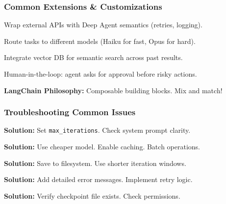 \documentclass[aspectratio=169,11pt]{beamer}
\begin{document}
\begin{frame}[fragile]
\frametitle{Common Extensions \& Customizations}

\begin{conceptbox}
Wrap external APIs with Deep Agent semantics (retries, logging).
\end{conceptbox}

\begin{conceptbox}
Route tasks to different models (Haiku for fast, Opus for hard).
\end{conceptbox}

\begin{conceptbox}
Integrate vector DB for semantic search across past results.
\end{conceptbox}

\begin{conceptbox}
Human-in-the-loop: agent asks for approval before risky actions.
\end{conceptbox}

\vspace{0.5em}
\textcolor{lcblue}{\textbf{LangChain Philosophy:}} Composable building blocks. Mix and match!

\end{frame}

\begin{frame}[fragile]
\frametitle{Troubleshooting Common Issues}

\begin{warningbox}
\textbf{Solution:} Set \texttt{max\_iterations}. Check system prompt clarity.
\end{warningbox}

\begin{warningbox}
\textbf{Solution:} Use cheaper model. Enable caching. Batch operations.
\end{warningbox}

\begin{warningbox}
\textbf{Solution:} Save to filesystem. Use shorter iteration windows.
\end{warningbox}

\begin{warningbox}
\textbf{Solution:} Add detailed error messages. Implement retry logic.
\end{warningbox}

\begin{warningbox}
\textbf{Solution:} Verify checkpoint file exists. Check permissions.
\end{warningbox}

\end{frame}
\end{document}
